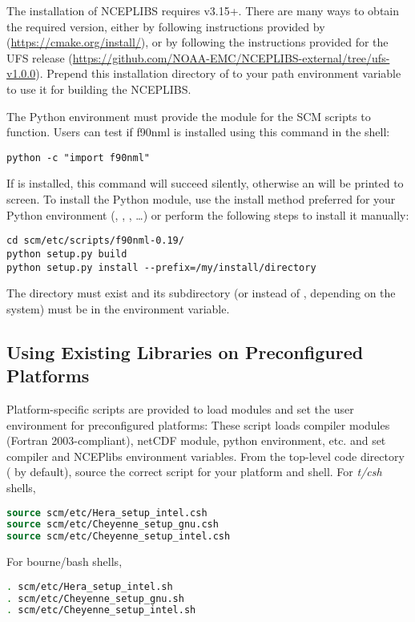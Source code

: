 The installation of NCEPLIBS requires  v3.15+. There are many ways to obtain the required version, either by following instructions provided by  (\url{https://cmake.org/install/}), or by following the instructions provided for the UFS release (\url{https://github.com/NOAA-EMC/NCEPLIBS-external/tree/ufs-v1.0.0}). Prepend this installation directory of  to your path environment variable to use it for building the NCEPLIBS.

The Python environment must provide the  module for the SCM scripts to function. Users can test if f90nml is installed using this command in the shell:
\begin{lstlisting}
python -c "import f90nml"
\end{lstlisting}
If  is installed, this command will succeed silently, otherwise an  will be printed to screen. To install the  Python module, use the install method preferred for your Python environment (, , , \dots) or perform the following steps to install it manually:
\begin{lstlisting}
cd scm/etc/scripts/f90nml-0.19/
python setup.py build
python setup.py install --prefix=/my/install/directory
\end{lstlisting}
The directory  must exist and its subdirectory  (or  instead of , depending on the system) must be in the  environment variable.
\subsection{Using Existing Libraries on Preconfigured Platforms}\label{section: use_preconfigured_platforms}
Platform-specific scripts are provided to load modules and set the user environment for preconfigured platforms: These script loads compiler modules (Fortran 2003-compliant), netCDF module, python environment, etc. and set compiler and NCEPlibs environment variables. From the top-level code directory ( by default), source the correct script for your platform and shell. For \textit{t/csh} shells,
\begin{lstlisting}[language=csh]
source scm/etc/Hera_setup_intel.csh
source scm/etc/Cheyenne_setup_gnu.csh
source scm/etc/Cheyenne_setup_intel.csh
\end{lstlisting}
For bourne/bash shells,
\begin{lstlisting}[language=bash]
. scm/etc/Hera_setup_intel.sh
. scm/etc/Cheyenne_setup_gnu.sh
. scm/etc/Cheyenne_setup_intel.sh
\end{lstlisting}

